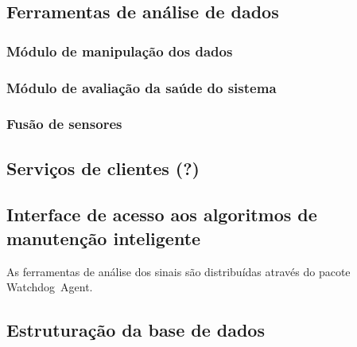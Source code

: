 \subsection{Ferramentas de análise de dados}

\subsubsection{Módulo de manipulação dos dados}

\subsubsection{Módulo de avaliação da saúde do sistema}

\subsubsection{Fusão de sensores}


\subsection{Serviços de clientes (?)}


\subsection{Interface de acesso aos algoritmos de manutenção inteligente}

As ferramentas de análise dos sinais são distribuídas através do pacote Watchdog~Agent.

\iffalse
Funcionalidade para carregar módulos de diagnóstico nos dispositivos. As ferramentas do Watchdog
poderiam ser estendidas e embarcadas em um arquivo JAR. As ferramentas poderiam ser enviadas para os
dispositivos através de serviços e utilizadas localmente, sem necessidade de acesso remoto ao
Watchdog Agent.
\fi


\subsection{Estruturação da base de dados}




